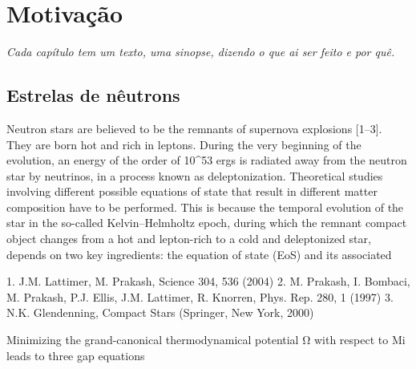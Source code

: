\chapter{Motivação}

\begin{fullwidth}\it
Cada capítulo tem um texto, uma sinopse, dizendo o que ai ser feito e por quê.
\end{fullwidth}

\section{Estrelas de nêutrons}

Neutron stars are believed to be the remnants of supernova
explosions [1–3]. They are born hot and rich in leptons. During
the very beginning of the evolution, an energy of the order
of 10^53 ergs is radiated away from the neutron star by
neutrinos, in a process known as deleptonization. Theoretical
studies involving different possible equations of state
that result in different matter composition have to be performed.
This is because the temporal evolution of the star
in the so-called Kelvin–Helmholtz epoch, during which the
remnant compact object changes from a hot and lepton-rich
to a cold and deleptonized star, depends on two key ingredients:
the equation of state (EoS) and its associated

1. J.M. Lattimer, M. Prakash, Science 304, 536 (2004)
2. M. Prakash, I. Bombaci, M. Prakash, P.J. Ellis, J.M. Lattimer,
R. Knorren, Phys. Rep. 280, 1 (1997)
3. N.K. Glendenning, Compact Stars (Springer, New York, 2000)

Minimizing the grand-canonical thermodynamical potential
Ω with respect to Mi leads to three gap equations